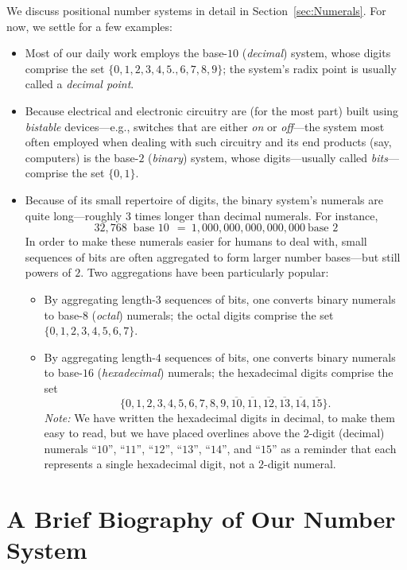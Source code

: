 \noindent
We discuss positional number systems in detail in
Section~\ref{sec:Numerals}.  For now, we settle for a few examples:
\begin{itemize}
\item
Most of our daily work employs the base-$10$ ({\it decimal}) system,
whose digits comprise the set $\{0, 1, 2, 3, 4, 5., 6, 7, 8, 9\}$; the
system's radix point is usually called a {\em decimal point}.

\item
Because electrical and electronic circuitry are (for the most part)
built using {\it bistable} devices---e.g., switches that are either
{\em on} or {\em off}---the system most often employed when dealing
with such circuitry and its end products (say, computers) is the
base-$2$ ({\it binary}) system, whose digits---usually called {\it
  bits}---comprise the set $\{0, 1\}$.

\item
Because of its small repertoire of digits, the binary system's
numerals are quite long---roughly $3$ times longer than decimal
numerals.  For instance,
\[ 32,768 \ \mbox{ base $10$} \ \ = \ 1,000,000,000,000,000 \ \mbox{
  base $2$}
\]
In order to make these numerals easier for humans to deal with, small
sequences of bits are often aggregated to form larger number bases---but
still powers of $2$.  Two aggregations have been particularly popular:
  \begin{itemize}
  \item
By aggregating length-$3$ sequences of bits, one converts binary
numerals to base-$8$ ({\it octal}) numerals; the octal digits comprise
the set $\{0, 1, 2, 3, 4, 5, 6, 7\}$.
  \item
By aggregating length-$4$ sequences of bits, one converts binary
numerals to base-$16$ ({\it hexadecimal}) numerals; the hexadecimal
digits comprise the set
\[ \{0, 1, 2, 3, 4, 5, 6, 7, 8, 9, \overline{10}, \overline{11},
\overline{12}, \overline{13}, \overline{14}, \overline{15}\}.
\]
{\it Note:} We have written the hexadecimal digits in decimal, to make
them easy to read, but we have placed overlines above the $2$-digit
(decimal) numerals ``$10$'', ``$11$'', ``$12$'', ``$13$'', ``$14$'',
and ``$15$'' as a reminder that each represents a single hexadecimal
digit, not a $2$-digit numeral.
  \end{itemize}
\end{itemize}


\section{A Brief Biography of Our Number System}
\label{sec:number-taxonomy}
\label{sec:numbers}

